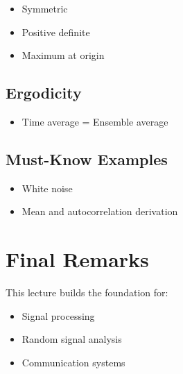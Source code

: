 \documentclass[11pt]{article}
\begin{document}
\begin{itemize}
    \item Symmetric
    \item Positive definite
    \item Maximum at origin
\end{itemize}

\subsection{Ergodicity}

\begin{itemize}
    \item Time average = Ensemble average
\end{itemize}

\subsection{Must-Know Examples}

\begin{itemize}
    \item White noise
    \item Mean and autocorrelation derivation
\end{itemize}

\section{Final Remarks}

This lecture builds the foundation for:
\begin{itemize}
    \item Signal processing
    \item Random signal analysis
    \item Communication systems
\end{itemize}
\end{document}

